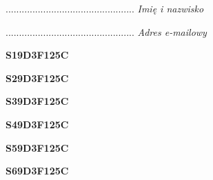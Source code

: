 \begin{turn}{90}\begin{minipage}{\linewidth} \vspace{20mm} ................................................  \textit{Imię i nazwisko}\end{minipage}\end{turn}

\begin{turn}{90}\begin{minipage}{\linewidth} \vspace{20mm} ................................................  \textit{Adres e-mailowy}\end{minipage}\end{turn}

\begin{turn}{90}\huge \begin{minipage}{\linewidth} \vspace{10mm}\textbf{S19D3F125C}\end{minipage}\end{turn}

\begin{turn}{90}\huge \begin{minipage}{\linewidth} \vspace{10mm}\textbf{S29D3F125C}\end{minipage}\end{turn}

\begin{turn}{90}\huge \begin{minipage}{\linewidth} \vspace{10mm}\textbf{S39D3F125C}\end{minipage}\end{turn}

\begin{turn}{90}\huge \begin{minipage}{\linewidth} \vspace{10mm}\textbf{S49D3F125C}\end{minipage}\end{turn}

\begin{turn}{90}\huge \begin{minipage}{\linewidth} \vspace{10mm}\textbf{S59D3F125C}\end{minipage}\end{turn}

\begin{turn}{90}\huge \begin{minipage}{\linewidth} \vspace{10mm}\textbf{S69D3F125C}\end{minipage}\end{turn}

